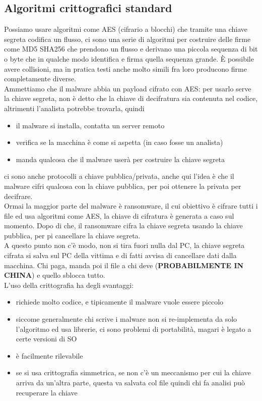 \documentclass[12pt, oneside]{extbook}
\begin{document}
\subsection{Algoritmi crittografici standard}
Possiamo usare algoritmi come AES (cifrario a blocchi) che tramite una chiave segreta codifica un flusso, ci sono una serie di algoritmi per costruire delle firme come MD5 SHA256 che prendono un flusso e derivano una piccola sequenza di bit o byte che in qualche modo identifica e firma quella sequenza grande. È possibile avere collisioni, ma in pratica testi anche molto simili fra loro producono firme completamente diverse.\\Ammettiamo che il malware abbia un payload cifrato con AES: per usarlo serve la chiave segreta, non è detto che la chiave di decifratura sia contenuta nel codice, altrimenti l'analista potrebbe trovarla, quindi 
\begin{itemize}
	\item il malware si installa, contatta un server remoto
	\item verifica se la macchina è come si aspetta (in caso fosse un analista)
	\item manda qualcosa che il malware userà per costruire la chiave segreta
\end{itemize}
ci sono anche protocolli a chiave pubblica/privata, anche qui l'idea è che il malware cifri qualcosa con la chiave pubblica, per poi ottenere la privata per decifrare.\\Ormai la maggior parte del malware è ransomware, il cui obiettivo è cifrare tutti i file ed usa algoritmi come AES, la chiave di cifratura è generata a caso sul momento. Dopo di che, il ransomware cifra la chiave segreta usando la chiave pubblica, per pi cancellare la chiave segreta.\\A questo punto non c'è modo, non si tira fuori nulla dal PC, la chiave segreta cifrata si salva sul PC della vittima e di fatti avvisa di cancellare dati dalla macchina. Chi paga, manda poi il file a chi deve (\textbf{\textsf{PROBABILMENTE IN CHINA}}) e quello sblocca tutto.\\L'uso della crittografia ha degli svantaggi:
\begin{itemize}
	\item richiede molto codice, e tipicamente il malware vuole essere piccolo
	\item siccome generalmente chi scrive i malware non si re-implementa da solo l'algoritmo ed usa librerie, ci sono problemi di portabilità, magari è legato a certe versioni di SO
	\item è facilmente rilevabile
	\item se si usa crittografia simmetrica, se non c'è un meccanismo per cui la chiave arriva da un'altra parte, questa va salvata col file quindi chi fa analisi può recuperare la chiave
\end{itemize}
\end{document}
